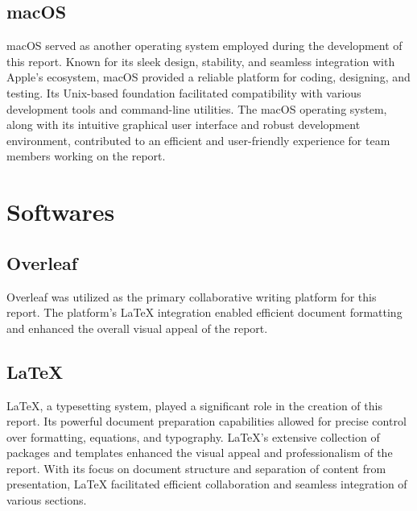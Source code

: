 \vspace{2cm}

\subsection*{macOS}

macOS served as another operating system employed during the development of this report. Known for its sleek design, stability, and seamless integration with Apple's ecosystem, macOS provided a reliable platform for coding, designing, and testing. Its Unix-based foundation facilitated compatibility with various development tools and command-line utilities. The macOS operating system, along with its intuitive graphical user interface and robust development environment, contributed to an efficient and user-friendly experience for team members working on the report.


\section*{Softwares}


\vspace{0.5cm}

\subsection*{Overleaf} 


Overleaf was utilized as the primary collaborative writing platform for this report. The platform's LaTeX integration enabled efficient document formatting and enhanced the overall visual appeal of the report.

\vspace{1cm}

\subsection*{LaTeX}

LaTeX, a typesetting system, played a significant role in the creation of this report. Its powerful document preparation capabilities allowed for precise control over formatting, equations, and typography. LaTeX's extensive collection of packages and templates enhanced the visual appeal and professionalism of the report. With its focus on document structure and separation of content from presentation, LaTeX facilitated efficient collaboration and seamless integration of various sections.

\vspace{1cm}

